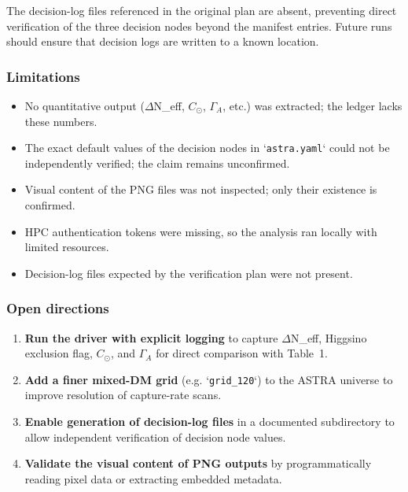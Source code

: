 \documentclass[11pt,a4paper]{article}
\begin{document}
The decision-log files referenced in the original plan are absent, preventing direct verification of the three decision nodes beyond the manifest entries. Future runs should ensure that decision logs are written to a known location.

\subsubsection*{Limitations}
\begin{itemize}
  \item No quantitative output ($\Delta$N\_eff, $C_{\odot}$, $\Gamma_{A}$, etc.) was extracted; the ledger lacks these numbers.
  \item The exact default values of the decision nodes in `\texttt{astra.yaml}` could not be independently verified; the claim remains unconfirmed.
  \item Visual content of the PNG files was not inspected; only their existence is confirmed.
  \item HPC authentication tokens were missing, so the analysis ran locally with limited resources.
  \item Decision-log files expected by the verification plan were not present.
\end{itemize}
\subsubsection*{Open directions}
\begin{enumerate}
  \item \textbf{Run the driver with explicit logging} to capture $\Delta$N\_eff, Higgsino exclusion flag, $C_{\odot}$, and $\Gamma_{A}$ for direct comparison with Table~1.
  \item \textbf{Add a finer mixed-DM grid} (e.g. `\texttt{grid\_\allowbreak{}120}`) to the ASTRA universe to improve resolution of capture-rate scans.
  \item \textbf{Enable generation of decision-log files} in a documented subdirectory to allow independent verification of decision node values.
  \item \textbf{Validate the visual content of PNG outputs} by programmatically reading pixel data or extracting embedded metadata.
\end{enumerate}
\end{document}
